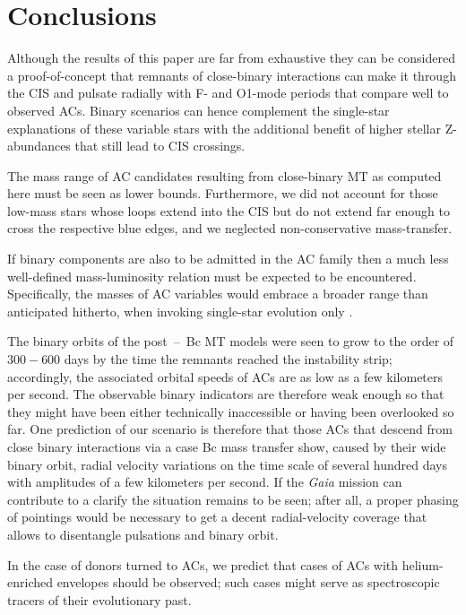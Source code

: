 \documentclass[a4paper,fleqn,usenatbib]{mnras}
\begin{document}
\section{Conclusions}
Although the results of this paper are far from exhaustive they can be considered 
a proof-of-concept that remnants of close-binary interactions
can make it through the CIS and pulsate radially with F- and O1-mode periods that compare 
well to observed ACs. Binary scenarios can hence complement the single-star
explanations of these variable stars with the additional benefit of higher stellar Z-abundances 
that still lead to CIS crossings.  

The mass range of AC candidates resulting from close-binary MT as computed here must 
be seen as lower bounds. Furthermore, we did not account for those low-mass stars whose 
loops extend into the CIS but do not extend far enough to cross the respective blue edges, and 
we neglected non-conservative mass-transfer. 

If binary components are also to be admitted in the AC family then a much less well-defined 
mass-luminosity relation must be expected to be encountered. Specifically, the masses 
of AC variables would embrace a broader range than anticipated hitherto, 
when invoking single-star evolution only \citep[e.g.][]{Fiorentino2012}. 

The binary orbits of the post~--~Bc MT models were seen to grow to the order of $300 - 600$ 
days by the time the remnants reached the instability strip; 
accordingly, the associated orbital speeds of ACs are as low as a few kilometers per second. 
The observable binary indicators are therefore weak enough so that
they might have been either technically inaccessible or having been overlooked so far.
One prediction of our scenario is therefore that those ACs that descend from close binary 
interactions via a case Bc mass transfer show, caused by their wide binary orbit, 
radial velocity variations on the time scale of several hundred days with amplitudes 
of a few kilometers per second. 
If the \emph{Gaia }mission can contribute to a clarify the situation remains to be seen; 
after all, a proper phasing of pointings would be necessary to get a decent radial-velocity 
coverage that allows to disentangle pulsations and binary orbit.

In the case of donors turned to ACs, we predict that cases of ACs with helium-enriched envelopes 
should be observed; such cases might serve as spectroscopic tracers of their evolutionary past.     
\end{document}
